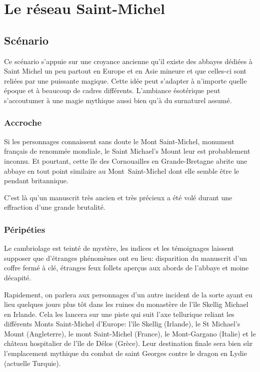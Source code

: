 \chapter{Le réseau Saint-Michel}

\section{Scénario}

Ce scénario s'appuie sur une croyance ancienne qu'il existe des abbayes dédiées à Saint Michel un peu partout en Europe et en Asie mineure et que celles-ci sont reliées par une puissante magique.
Cette idée peut s'adapter à n'importe quelle époque et à beaucoup de cadres différents.
L'ambiance ésotérique peut s'accoutumer à une magie mythique aussi bien qu'à du surnaturel assumé.

\subsection{Accroche}

Si les personnages connaissent sans doute le Mont Saint-Michel, monument français de renommée mondiale, le Saint Michael's Mount leur est probablement inconnu. Et pourtant, cette île des Cornouailles en Grande-Bretagne abrite une abbaye en tout point similaire au Mont Saint-Michel dont elle semble être le pendant britannique.

C'est là qu'un manuscrit très ancien et très précieux a été volé durant une effraction d'une grande brutalité.

\subsection{Péripéties}

Le cambriolage est teinté de mystère, les indices et les témoignages laissent supposer que d'étranges phénomènes ont eu lieu: disparition du manuscrit d'un coffre fermé à clé, étranges feux follets aperçus aux abords de l'abbaye et moine décapité.

Rapidement, on parlera aux personnages d'un autre incident de la sorte ayant eu lieu quelques jours plus tôt dans les ruines du monastère de l'île Skellig Michael en Irlande.
Cela les lancera sur une piste qui suit l'axe tellurique reliant les différents Monts Saint-Michel d'Europe: l'île Skellig (Irlande), le St Michael's Mount (Angleterre), le mont Saint-Michel (France), le Mont-Gargano (Italie) et le château hospitalier de l'île de Délos (Grèce).
Leur destination finale sera bien sûr l'emplacement mythique du combat de saint Georges contre le dragon en Lydie (actuelle Turquie).

